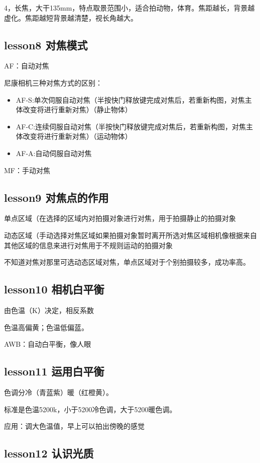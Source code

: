 \documentclass{book}
\begin{document}
4，长焦，大干135mm，特点取景范围小，适合拍动物，体育。焦距越长，背景越虚化。焦距越短背景越清楚，视长角越大。

\subsection{lesson8 对焦模式}

AF：自动对焦


尼康相机三种对焦方式的区别：\begin{itemize}
  \item AF-S:单次伺服自动对焦（半按快门释放键完成对焦后，若重新构图，对焦主体改变将进行重新对焦）（静止物体）
  \item AF-C:连续伺服自动对焦（半按快门释放键完成对焦后，若重新构图，对焦主体改变将进行重新对焦）（运动物体）
  \item AF-A:自动伺服自动对焦
\end{itemize}

MF：手动对焦

\subsection{lesson9 对焦点的作用}

单点区域（在选择的区域内对拍摄对象进行对焦，用于拍摄静止的拍摄对象

动态区域（手动选择对焦区域如果拍摄对象暂时离开所选对焦区域相机像根据来自其他区域的信息来进行对焦用于不规则运动的拍摄对象

不知道对焦对那里可选动态区域对焦，单点区域对于个别拍摄较多，成功率高。

\subsection{lesson10 相机白平衡}

由色温（K）决定，相反系数

色温高偏黄；色温低偏蓝。

AWB：自动白平衡，像人眼

\subsection{lesson11 运用白平衡}

色调分冷（青蓝紫）暖（红橙黄）。

标准是色温5200k，小于5200冷色调，大于5200暖色调。

应用：调大色温值，早上可以拍出傍晚的感觉

\subsection{lesson12 认识光质}
\end{document}
